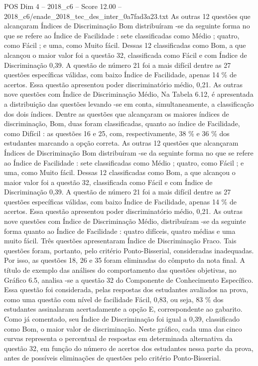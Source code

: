 \begin{textsample}{POS Dim 4 – 2018\_c6 – Score 12.00 – 2018\_c6/enade\_2018\_tec\_des\_inter\_0a7fad3a23.txt}
As outras 12 questões que alcançaram Índices de Discriminação Bom distribuíram -se da seguinte forma no que se refere ao Índice de Facilidade : sete classificadas como Médio ; quatro, como Fácil ; e uma, como Muito fácil.
Dessas 12 classificadas como Bom, a que alcançou o maior valor foi a questão 32, classificada como Fácil e com Índice de Discriminação 0,39.
A questão de número 21 foi a mais difícil dentre as 27 questões específicas válidas, com baixo Índice de Facilidade, apenas 14 \% de acertos.
Essa questão apresentou poder discriminatório médio, 0,21.
As outras nove questões com Índice de Discriminação Médio, Na Tabela 6.12, é apresentada a distribuição das questões levando -se em conta, simultaneamente, a classificação dos dois índices.
Dentre as questões que alcançaram os maiores índices de discriminação, Bom, duas foram classificadas, quanto ao índice de Facilidade, como Difícil : as questões 16 e 25, com, respectivamente, 38 \% e 36 \% dos estudantes marcando a opção correta.
As outras 12 questões que alcançaram Índices de Discriminação Bom distribuíram -se da seguinte forma no que se refere ao Índice de Facilidade : sete classificadas como Médio ; quatro, como Fácil ; e uma, como Muito fácil.
Dessas 12 classificadas como Bom, a que alcançou o maior valor foi a questão 32, classificada como Fácil e com Índice de Discriminação 0,39.
A questão de número 21 foi a mais difícil dentre as 27 questões específicas válidas, com baixo Índice de Facilidade, apenas 14 \% de acertos.
Essa questão apresentou poder discriminatório médio, 0,21.
As outras nove questões com Índice de Discriminação Médio, distribuíram -se da seguinte forma quanto ao Índice de Facilidade : quatro difíceis, quatro médias e uma muito fácil.
Três questões apresentaram Índice de Discriminação Fraco.
Tais questões foram, portanto, pelo critério Ponto-Bisserial, consideradas inadequadas.
Por isso, as questões 18, 26 e 35 foram eliminadas do cômputo da nota final.
A título de exemplo das análises do comportamento das questões objetivas, no Gráfico 6.5, analisa -se a questão 32 do Componente de Conhecimento Específico.
Essa questão foi considerada, pelas respostas dos estudantes avaliados na prova, como uma questão com nível de facilidade Fácil, 0,83, ou seja, 83 \% dos estudantes assinalaram acertadamente a opção E, correspondente ao gabarito.
Como já comentado, seu Índice de Discriminação foi igual a 0,39, classificado como Bom, o maior valor de discriminação.
Neste gráfico, cada uma das cinco curvas representa o percentual de respostas em determinada alternativa da questão 32, em função do número de acertos dos estudantes nessa parte da prova, antes de possíveis eliminações de questões pelo critério Ponto-Bisserial.

\end{textsample}
